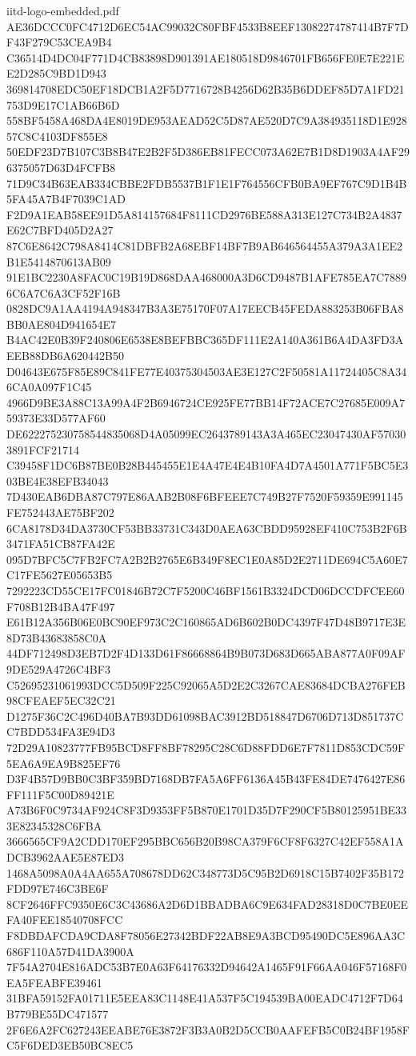 \begin{filecontents*}[overwrite]{iitd-logo-embedded.pdf}
AE36DCCC0FC4712D6EC54AC99032C80FBF4533B8EEF13082274787414B7F7DF43F279C53CEA9B4
C36514D4DC04F771D4CB83898D901391AE180518D9846701FB656FE0E7E221EE2D285C9BD1D943
369814708EDC50EF18DCB1A2F5D7716728B4256D62B35B6DDEF85D7A1FD21753D9E17C1AB66B6D
558BF5458A468DA4E8019DE953AEAD52C5D87AE520D7C9A384935118D1E92857C8C4103DF855E8
50EDF23D7B107C3B8B47E2B2F5D386EB81FECC073A62E7B1D8D1903A4AF296375057D63D4FCFB8
71D9C34B63EAB334CBBE2FDB5537B1F1E1F764556CFB0BA9EF767C9D1B4B5FA45A7B4F7039C1AD
F2D9A1EAB58EE91D5A814157684F8111CD2976BE588A313E127C734B2A4837E62C7BFD405D2A27
87C6E8642C798A8414C81DBFB2A68EBF14BF7B9AB646564455A379A3A1EE2B1E5414870613AB09
91E1BC2230A8FAC0C19B19D868DAA468000A3D6CD9487B1AFE785EA7C78896C6A7C6A3CF52F16B
0828DC9A1AA4194A948347B3A3E75170F07A17EECB45FEDA883253B06FBA8BB0AE804D941654E7
B4AC42E0B39F240806E6538E8BEFBBC365DF111E2A140A361B6A4DA3FD3AEEB88DB6A620442B50
D04643E675F85E89C841FE77E40375304503AE3E127C2F50581A11724405C8A346CA0A097F1C45
4966D9BE3A88C13A99A4F2B6946724CE925FE77BB14F72ACE7C27685E009A759373E33D577AF60
DE622275230758544835068D4A05099EC2643789143A3A465EC23047430AF570303891FCF21714
C39458F1DC6B87BE0B28B445455E1E4A47E4E4B10FA4D7A4501A771F5BC5E303BE4E38EFB34043
7D430EAB6DBA87C797E86AAB2B08F6BFEEE7C749B27F7520F59359E991145FE752443AE75BF202
6CA8178D34DA3730CF53BB33731C343D0AEA63CBDD95928EF410C753B2F6B3471FA51CB87FA42E
095D7BFC5C7FB2FC7A2B2B2765E6B349F8EC1E0A85D2E2711DE694C5A60E7C17FE5627E05653B5
7292223CD55CE17FC01846B72C7F5200C46BF1561B3324DCD06DCCDFCEE60F708B12B4BA47F497
E61B12A356B06E0BC90EF973C2C160865AD6B602B0DC4397F47D48B9717E3E8D73B43683858C0A
44DF712498D3EB7D2F4D133D61F86668864B9B073D683D665ABA877A0F09AF9DE529A4726C4BF3
C52695231061993DCC5D509F225C92065A5D2E2C3267CAE83684DCBA276FEB98CFEAEF5EC32C21
D1275F36C2C496D40BA7B93DD61098BAC3912BD518847D6706D713D851737CC7BDD534FA3E94D3
72D29A10823777FB95BCD8FF8BF78295C28C6D88FDD6E7F7811D853CDC59F5EA6A9EA9B825EF76
D3F4B57D9BB0C3BF359BD7168DB7FA5A6FF6136A45B43FE84DE7476427E86FF111F5C00D89421E
A73B6F0C9734AF924C8F3D9353FF5B870E1701D35D7F290CF5B80125951BE333E82345328C6FBA
3666565CF9A2CDD170EF295BBC656B20B98CA379F6CF8F6327C42EF558A1ADCB3962AAE5E87ED3
1468A5098A0A4AA655A708678DD62C348773D5C95B2D6918C15B7402F35B172FDD97E746C3BE6F
8CF2646FFC9350E6C3C43686A2D6D1BBADBA6C9E634FAD28318D0C7BE0EEFA40FEE18540708FCC
F8DBDAFCDA9CDA8F78056E27342BDF22AB8E9A3BCD95490DC5E896AA3C686F110A57D41DA3900A
7F54A2704E816ADC53B7E0A63F64176332D94642A1465F91F66AA046F57168F0EA5FEABFE39461
31BFA59152FA01711E5EEA83C1148E41A537F5C194539BA00EADC4712F7D64B779BE55DC471577
2F6E6A2FC627243EEABE76E3872F3B3A0B2D5CCB0AAFEFB5C0B24BF1958FC5F6DED3EB50BC8EC5

\end{filecontents*}
